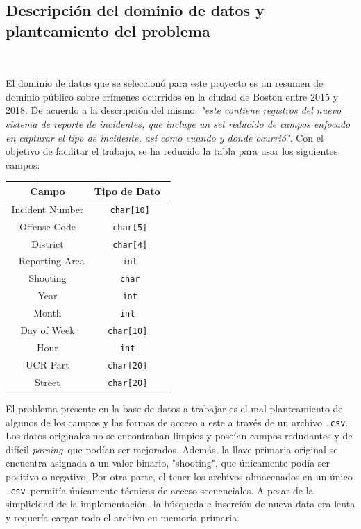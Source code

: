 \documentclass{article}
\begin{document}
    \subsection{Descripción del dominio de datos y planteamiento del problema} 
      
      El dominio de datos que se seleccionó para este proyecto es un resumen de dominio público sobre crímenes ocurridos en la ciudad de Boston entre 2015 y 2018. De acuerdo a la descripción del mismo: \textit{"este contiene registros del nuevo sistema de reporte de incidentes, que incluye un set reducido de campos enfocado en capturar el tipo de incidente, así como cuando y donde ocurrió"}. Con el objetivo de facilitar el trabajo, se ha reducido la tabla para usar los siguientes campos:

      \begin{center}
      \begin{tabular}{| c | c |}
      
        \hline
        \textbf{Campo} & \textbf{Tipo de Dato} \\
        \hline
        Incident Number & \texttt{char[10]} \\
        Offense Code & \texttt{char[5]} \\
        District & \texttt{char[4]} \\ 
        Reporting Area & \texttt{int} \\
        Shooting & \texttt{char} \\
        Year & \texttt{int} \\
        Month & \texttt{int} \\
        Day of Week & \texttt{char[10]} \\
        Hour & \texttt{int} \\
        UCR Part & \texttt{char[20]} \\
        Street & \texttt{char[20]} \\
        \hline

      \end{tabular}
      \end{center} 

      El problema presente en la base de datos a trabajar es el mal planteamiento de algunos de los campos y las formas de acceso a este a través de un archivo \texttt{.csv}. Los datos originales no se encontraban limpios y poseían campos redudantes y de difícil \textit{parsing} que podían ser mejorados. Además, la llave primaria original se encuentra asignada a un valor binario, "shooting", que únicamente podía ser positivo o negativo. Por otra parte, el tener los archivos almacenados en un único \texttt{.csv} permitía únicamente técnicas de acceso secuenciales. A pesar de la simplicidad de la implementación, la búsqueda e inserción de nueva data era lenta y requería cargar todo el archivo en memoria primaria.
\end{document}
